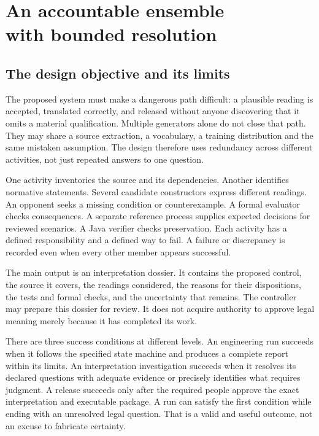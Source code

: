 \documentclass[12pt,a4paper,oneside,openany]{book}
\begin{document}
\chapter[An accountable ensemble with bounded resolution]{An accountable ensemble\\with bounded resolution}
\label{ch:ensemble}

\section{The design objective and its limits}
\label{merge:M06:00}


The proposed system must make a dangerous path difficult: a plausible reading is
accepted, translated correctly, and released without anyone discovering that it
omits a material qualification. Multiple generators alone do not close that path.
They may share a source extraction, a vocabulary, a training distribution and the
same mistaken assumption. The design therefore uses redundancy across different
activities, not just repeated answers to one question.

One activity inventories the source and its dependencies. Another identifies
normative statements. Several candidate constructors express different readings.
An opponent seeks a missing condition or counterexample. A formal evaluator
checks consequences. A separate reference process supplies expected decisions
for reviewed scenarios. A Java verifier checks preservation. Each activity has a
defined responsibility and a defined way to fail. A failure or discrepancy is
recorded even when every other member appears successful.

The main output is an interpretation dossier. It contains the proposed control,
the source it covers, the readings considered, the reasons for their dispositions,
the tests and formal checks, and the uncertainty that remains. The controller
may prepare this dossier for review. It does not acquire authority to approve
legal meaning merely because it has completed its work.

There are three success conditions at different levels. An engineering run
succeeds when it follows the specified state machine and produces a complete
report within its limits. An interpretation investigation succeeds when it
resolves its declared questions with adequate evidence or precisely identifies
what requires judgment. A release succeeds only after the required people approve
the exact interpretation and executable package. A run can satisfy the first
condition while ending with an unresolved legal question. That is a valid and
useful outcome, not an excuse to fabricate certainty.
\end{document}
